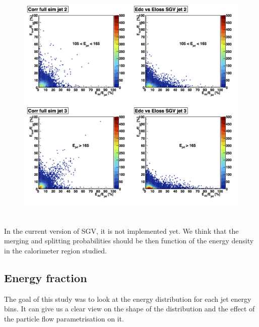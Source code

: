 \documentclass[a4paper,12pt]{article}
\begin{document}
\begin{minipage}{\linewidth}
\begin{minipage}{0.4\linewidth}
\begin{figure}[H]
    \includegraphics[width=\linewidth]{Correlation_2.png} 
\end{figure}
\end{minipage}
   \label{fig:jet_track_level}
\end{minipage}\\[0.5cm]

In the current version of SGV, it is not implemented yet. We think that the merging and splitting probabilities should be then function of the energy density in the calorimeter region studied.

\subsection{Energy fraction}

The goal of this study was to look at the energy distribution for each jet energy bins. It can give us a clear view on the shape of the distribution and the effect of the particle flow parametrisation on it.
\end{document}
